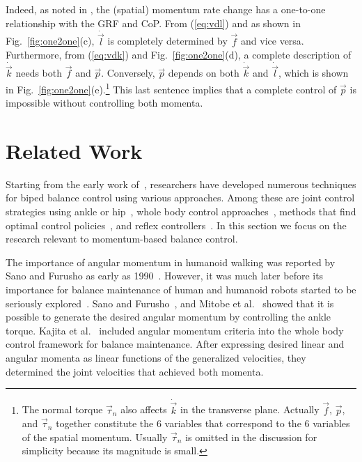 \documentclass{llncs}
\newcommand{\vp}{\vec{p}}
\newcommand{\vtau}{\vec{\tau}}
\newcommand{\vf}{\vec{f}}
\newcommand{\vdk} {\dot{\vec{k}}}
\newcommand{\vdl} {\dot{\vec{l}}}
\begin{document}
Indeed, as noted in \cite{Macchietto09}, the (spatial) momentum
rate change has a one-to-one relationship with the GRF and CoP.
From (\ref{eq:vdl}) and as shown in Fig.~\ref{fig:one2one}(c), $\vdl$ is completely determined by
$\vf$ and vice versa. Furthermore, from (\ref{eq:vdk}) and Fig.~\ref{fig:one2one}(d), a complete
description of $\vdk$ needs both $\vf$ and
$\vp$. Conversely, $\vp$ depends on both $\vdk$ and $\vdl$,  which is shown in Fig.~\ref{fig:one2one}(e).\footnote{The normal torque $\vtau_n$ also affects $\vdk$ in the
transverse plane. Actually $\vf$, $\vp$, and $\vtau_n$ together
constitute the 6 variables that correspond to the 6 variables of the spatial momentum.
Usually $\vtau_n$ is omitted in the discussion for simplicity
because its magnitude is small.}
This last sentence implies that a complete control of $\vp$ is impossible
without controlling both momenta.%


\section{Related Work}


Starting from the early work of~\cite{Vuko69}, researchers have
developed numerous techniques for biped balance control
using various approaches.
Among these are joint control strategies using ankle or hip~\cite{Sano90,Stephens07},
whole body control approaches~\cite{Kagami00,Sugihara02,KKKFHYH03,Choi07,Park05,Stephens10},
methods that find optimal control policies~\cite{Zhou03,Muico09},
and reflex controllers~\cite{Huang05}.
In this section we focus on the research relevant
to momentum-based balance control.

The importance of angular momentum in humanoid walking was reported by Sano and
Furusho as early as 1990~\cite{Sano90}. However, it was much later before its
importance for balance maintenance
of human and humanoid robots started to be seriously explored~\cite{KKKFHYH03,Goswami04,PHH04}.
Sano and Furusho~\cite{Sano90}, and Mitobe et al.~\cite{Mitobe04}
showed that it is possible to generate the desired angular momentum
by controlling the ankle torque.
Kajita et al.~\cite{KKKFHYH03} included angular momentum criteria into the
whole body control framework for balance maintenance.
After expressing desired linear and angular momenta as linear functions of the
generalized velocities, they determined the joint velocities
that achieved both momenta.
\end{document}
